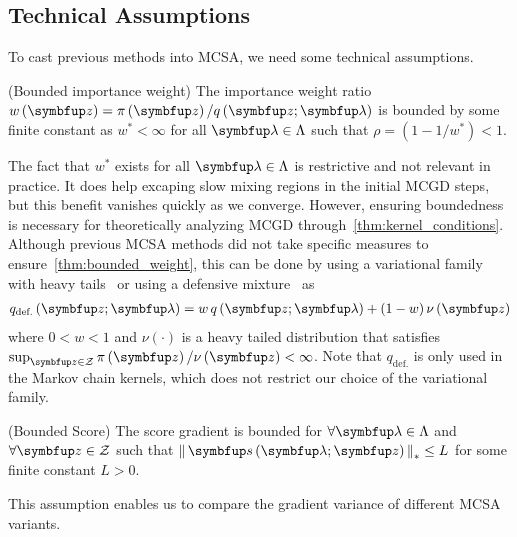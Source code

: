 \subsection{Technical Assumptions}
\vspace{-0.05in}
To cast previous methods into MCSA, we need some technical assumptions.
\begin{assumption}{(Bounded importance weight)}\label{thm:bounded_weight}
  The importance weight ratio \(w\left(\vz\right) = \pi\left(\vz\right) / q\left(\vz; \vlambda\right)\) is bounded by some finite constant as \(w^* < \infty\) for all \(\vlambda \in \Lambda\) such that \(\rho = \left(1 - 1/w^*\right) < 1\).
\end{assumption}
\vspace{-0.05in}
The fact that \(w^*\) exists for all \(\vlambda \in \Lambda\) is restrictive and not relevant in practice.
It does help excaping slow mixing regions in the initial MCGD steps, but this benefit vanishes quickly as we converge.
However, ensuring boundedness is necessary for theoretically analyzing MCGD through~\cref{thm:kernel_conditions}.
Although previous MCSA methods did not take specific measures to ensure~\cref{thm:bounded_weight}, this can be done by using a variational family with heavy tails~\citep{NEURIPS2018_25db67c5} or using a defensive mixture~\citep{hesterberg_weighted_1995, holden_adaptive_2009} as
\begin{align*}
  q_{\text{def.}}\left(\vz; \vlambda \right) = w \, q\left(\vz; \vlambda\right) + (1 - w) \, \nu\left(\vz\right)
\end{align*}
where \(0 < w < 1\) and \(\nu\left(\cdot\right)\) is a heavy tailed distribution that satisfies \(\sup_{\vz \in \mathcal{Z}} \pi\left(\vz\right) / \nu\left(\vz\right) < \infty\).
Note that \(q_{\text{def.}}\) is only used in the Markov chain kernels, which does not restrict our choice of the variational family.

\begin{assumption}{(Bounded Score)}\label{thm:bounded_score}
  The score gradient is bounded for \(\forall \vlambda \in \Lambda\) and \(\forall \vz \in \mathcal{Z}\) such that \(\norm{\vs\left(\vlambda; \vz\right)}_* \leq L \) for some finite constant \(L > 0\).
\end{assumption}
\vspace{-0.05in}
This assumption enables us to compare the gradient variance of different MCSA variants.

\vspace{-0.05in}
